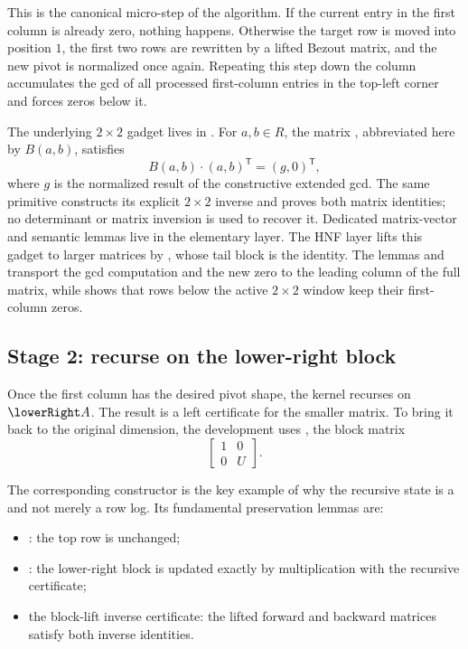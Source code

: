 This is the canonical micro-step of the algorithm. If the current entry in the
first column is already zero, nothing happens. Otherwise the target row is moved
into position \(1\), the first two rows are rewritten by a lifted Bezout matrix,
and the new pivot is normalized once again. Repeating this step down the column
accumulates the gcd of all processed first-column entries in the top-left corner
and forces zeros below it.

The underlying \(2 \times 2\) gadget lives in
. For \(a,b \in R\), the matrix
, abbreviated here by \(B(a,b)\), satisfies
\[
  B(a,b) \cdot (a,b)^\mathsf{T}
  = (g, 0)^\mathsf{T},
\]
where \(g\) is the normalized result of the constructive extended gcd. The
same primitive constructs its explicit \(2\times2\) inverse and proves both
matrix identities; no determinant or matrix inversion is used to recover it.
Dedicated matrix-vector and semantic lemmas live in the elementary layer. The
HNF layer lifts this gadget to larger
matrices by , whose tail block is the identity. The lemmas
 and
 transport the gcd computation and the
new zero to the leading column of the full matrix, while
 shows that rows below the active \(2 \times 2\)
window keep their first-column zeros.

\subsection{Stage 2: recurse on the lower-right block}

Once the first column has the desired pivot shape, the kernel recurses on
\(\lowerRight A\). The result is a left certificate for the smaller matrix. To
bring it back to the original dimension, the development uses
, the block matrix
\[
  \begin{bmatrix}
    1 & 0 \\
    0 & U
  \end{bmatrix}.
\]

The corresponding constructor  is the key example
of why the recursive state is a  and not merely a row log.
Its fundamental preservation lemmas are:

\begin{itemize}
  \item {}: the top row is unchanged;
  \item {}: the lower-right block is updated
    exactly by multiplication with the recursive certificate;
  \item the block-lift inverse certificate: the lifted forward and backward
    matrices satisfy both inverse identities.
\end{itemize}

